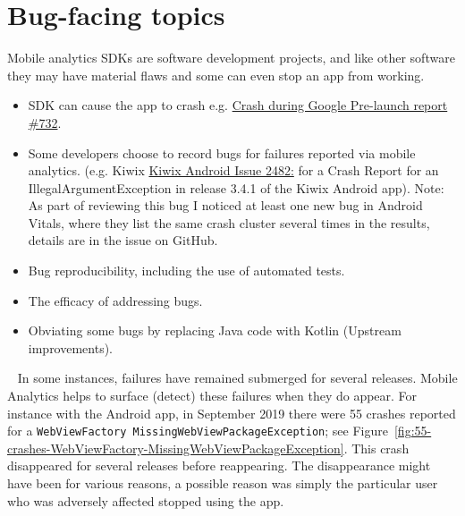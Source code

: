 \section{Bug-facing topics}
Mobile analytics SDKs are software development projects, and like other software they may have material flaws and some can even stop an app from working. 

\begin{itemize}
    \itemsep0em 
    \item SDK can cause the app to crash e.g. \href{https://github.com/segmentio/analytics-android/issues/732}{Crash during Google Pre-launch report \#732}.
    \item Some developers choose to record bugs for failures reported via mobile analytics. (e.g. Kiwix \href{https://github.com/kiwix/kiwix-android/issues/2482}{Kiwix Android Issue 2482:} for a Crash Report for an IllegalArgumentException in release 3.4.1 of the Kiwix Android app). Note: As part of reviewing this bug I noticed at least one new bug in Android Vitals, where they list the same crash cluster several times in the results, details are in the issue on GitHub.
    \item Bug reproducibility, including the use of automated tests.
    \item The efficacy of addressing bugs.
    \item Obviating some bugs by replacing Java code with Kotlin (Upstream improvements).
\end{itemize}

~\label{section-intermittent-appearances-of-bugs-55-crashes}
In some instances, failures have remained submerged for several releases. Mobile Analytics helps to surface (detect) these failures when they do appear. 
For instance with the  Android app, in September 2019 there were 55 crashes reported for a \texttt{WebViewFactory MissingWebViewPackageException}; see Figure~\ref{fig:55-crashes-WebViewFactory-MissingWebViewPackageException}. This crash disappeared for several releases before reappearing. The disappearance might have been for various reasons, a possible reason was simply the particular user who was adversely affected stopped using the app. 

